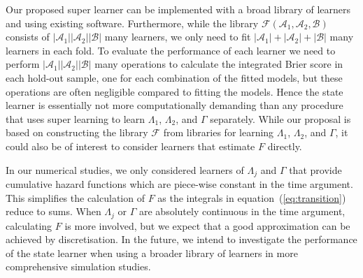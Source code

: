 \documentclass[numsec,webpdf,contemporary,medium,namedate]{oup-authoring-template}%
\theoremstyle{thmstyleone}%
\theoremstyle{thmstyletwo}%
\theoremstyle{thmstylethree}%
\newcommand{\1}{\mathds{1}}
\begin{document}
Our proposed super learner can be implemented with a broad library of learners
and using existing software.
Furthermore, while
the library \( \mathcal{F}(\mathcal{A}_1,\mathcal{A}_2,\mathcal{B}) \) consists
of \( |\mathcal{A}_1||\mathcal{A}_2||\mathcal{B}| \) many learners, we only need to fit
\( |\mathcal{A}_1| +|\mathcal{A}_2| + |\mathcal{B}| \) many learners in each fold. To
evaluate the performance of each learner we need to perform
\( |\mathcal{A}_1||\mathcal{A}_2||\mathcal{B}| \) many operations to calculate the
integrated Brier score in each hold-out sample, one for each combination of the
fitted models, but these operations are often negligible compared to fitting the
models. Hence the state learner is essentially not more computationally demanding
than any procedure that uses super learning to learn $\Lambda_1$, $\Lambda_2$,
and $\Gamma$ separately. While our proposal is based on constructing the library
\( \mathcal{F} \) from libraries for learning \( \Lambda_1 \), $\Lambda_2$, and
$\Gamma$, it could also be of interest to consider learners that estimate
\( F \) directly.

In our numerical studies, we only considered learners of $\Lambda_j$ and
$\Gamma$ that provide cumulative hazard functions which are piece-wise constant
in the time argument. This simplifies the calculation of \( F \) as the
integrals in equation~(\ref{eq:transition}) reduce to sums. When $\Lambda_j$ or
\( \Gamma \) are absolutely continuous in the time argument, calculating \( F \)
is more involved, but we expect that a good approximation can be achieved by
discretisation. In the future, we intend to investigate the performance of the
state learner when using a broader library of learners in more comprehensive
simulation studies.
\end{document}
